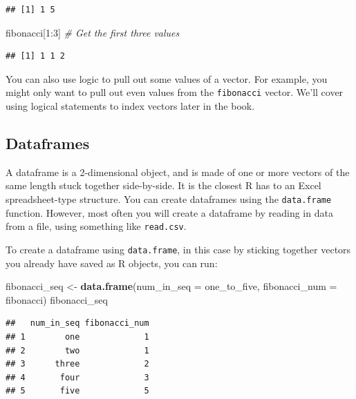 \documentclass[]{book}
\makeatletter
\newenvironment{Shaded}{\begin{snugshade}}{\end{snugshade}}
\newcommand{\KeywordTok}[1]{\textcolor[rgb]{0.13,0.29,0.53}{\textbf{{#1}}}}
\newcommand{\DataTypeTok}[1]{\textcolor[rgb]{0.13,0.29,0.53}{{#1}}}
\newcommand{\DecValTok}[1]{\textcolor[rgb]{0.00,0.00,0.81}{{#1}}}
\newcommand{\StringTok}[1]{\textcolor[rgb]{0.31,0.60,0.02}{{#1}}}
\newcommand{\CommentTok}[1]{\textcolor[rgb]{0.56,0.35,0.01}{\textit{{#1}}}}
\newcommand{\NormalTok}[1]{{#1}}
\newenvironment{kframe}{%
\medskip{}
\setlength{\fboxsep}{.8em}
 \def\at@end@of@kframe{}%
 \ifinner\ifhmode%
  \def\at@end@of@kframe{\end{minipage}}%
  \begin{minipage}{\columnwidth}%
 \fi\fi%
 \def\FrameCommand##1{\hskip\@totalleftmargin \hskip-\fboxsep
 \colorbox{shadecolor}{##1}\hskip-\fboxsep
     \hskip-\linewidth \hskip-\@totalleftmargin \hskip\columnwidth}%
 \MakeFramed {\advance\hsize-\width
   \@totalleftmargin\z@ \linewidth\hsize
   \@setminipage}}%
 {\par\unskip\endMakeFramed%
 \at@end@of@kframe}
\renewenvironment{Shaded}{\begin{kframe}}{\end{kframe}}
\makeatother
\begin{document}
\begin{verbatim}
## [1] 1 5
\end{verbatim}

\begin{Shaded}
\begin{Highlighting}[]
\NormalTok{fibonacci[}\DecValTok{1}\NormalTok{:}\DecValTok{3}\NormalTok{] }\CommentTok{# Get the first three values}
\end{Highlighting}
\end{Shaded}

\begin{verbatim}
## [1] 1 1 2
\end{verbatim}

You can also use logic to pull out some values of a vector. For example,
you might only want to pull out even values from the \texttt{fibonacci}
vector. We'll cover using logical statements to index vectors later in
the book.

\subsection{Dataframes}\label{dataframes}

A dataframe is a 2-dimensional object, and is made of one or more
vectors of the same length stuck together side-by-side. It is the
closest R has to an Excel spreadsheet-type structure. You can create
dataframes using the \texttt{data.frame} function. However, most often
you will create a dataframe by reading in data from a file, using
something like \texttt{read.csv}.

To create a dataframe using \texttt{data.frame}, in this case by
sticking together vectors you already have saved as R objects, you can
run:

\begin{Shaded}
\begin{Highlighting}[]
\NormalTok{fibonacci_seq <-}\StringTok{ }\KeywordTok{data.frame}\NormalTok{(}\DataTypeTok{num_in_seq =} \NormalTok{one_to_five,}
                            \DataTypeTok{fibonacci_num =} \NormalTok{fibonacci)}
\NormalTok{fibonacci_seq}
\end{Highlighting}
\end{Shaded}

\begin{verbatim}
##   num_in_seq fibonacci_num
## 1        one             1
## 2        two             1
## 3      three             2
## 4       four             3
## 5       five             5
\end{verbatim}
\end{document}
